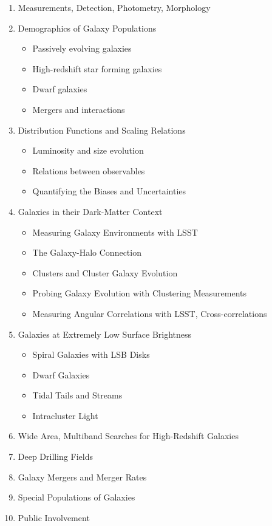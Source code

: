 \begin{enumerate}
\item Measurements, Detection, Photometry, Morphology
\item Demographics of Galaxy Populations
\begin{itemize}
\item Passively evolving galaxies
\item High-redshift star forming galaxies
\item Dwarf galaxies
\item Mergers and interactions
\end{itemize}
\item Distribution Functions and Scaling Relations
\begin{itemize}
\item Luminosity and size evolution
\item Relations between observables
\item Quantifying the Biases and Uncertainties
\end{itemize}
\item Galaxies in their Dark-Matter Context
\begin{itemize}
\item Measuring Galaxy Environments with LSST
\item The Galaxy-Halo Connection
\item Clusters and Cluster Galaxy Evolution
\item Probing Galaxy Evolution with Clustering Measurements
\item Measuring Angular Correlations with LSST, Cross-correlations
\end{itemize}
\item Galaxies at Extremely Low Surface Brightness
\begin{itemize}
\item Spiral Galaxies with LSB Disks
\item Dwarf Galaxies
\item Tidal Tails and Streams
\item Intracluster Light
\end{itemize}
\item Wide Area, Multiband Searches for High-Redshift Galaxies
\item Deep Drilling Fields
\item Galaxy Mergers and Merger Rates
\item Special Populations of Galaxies
\item Public Involvement
\end{enumerate}



 

